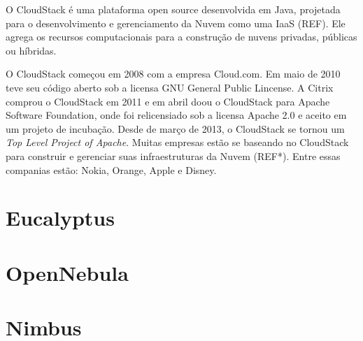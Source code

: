 O CloudStack é uma plataforma open source desenvolvida em Java, projetada para o desenvolvimento e gerenciamento da Nuvem como uma IaaS (REF). Ele agrega os recursos computacionais para a construção de nuvens privadas, públicas ou híbridas.

O CloudStack começou em 2008 com a empresa Cloud.com. Em maio de 2010 teve seu código aberto sob a licensa GNU General Public Lincense. A Citrix comprou o CloudStack em 2011 e em abril doou o CloudStack para Apache Software Foundation, onde foi relicensiado sob a licensa Apache 2.0 e aceito em um projeto de incubação. Desde de março de 2013, o CloudStack se tornou um \textit{Top Level Project of Apache}. Muitas empresas estão se baseando no CloudStack para construir e gerenciar suas infraestruturas da Nuvem (REF*). Entre essas companias estão: Nokia, Orange, Apple e Disney.



\section{Eucalyptus}

\section{OpenNebula}

\section{Nimbus}




